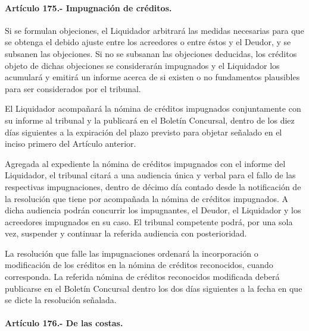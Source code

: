 \documentclass[
]{book}
\begin{document}
\hypertarget{artuxedculo-175.--impugnaciuxf3n-de-cruxe9ditos.}{%
\paragraph*{Artículo 175.- Impugnación de créditos.}\label{artuxedculo-175.--impugnaciuxf3n-de-cruxe9ditos.}}

Si se formulan objeciones, el Liquidador arbitrará las medidas necesarias para que se obtenga el debido ajuste entre los acreedores o entre éstos y el Deudor, y se subsanen las objeciones. Si no se subsanan las objeciones deducidas, los créditos objeto de dichas objeciones se considerarán impugnados y el Liquidador los acumulará y emitirá un informe acerca de si existen o no fundamentos plausibles para ser considerados por el tribunal.

El Liquidador acompañará la nómina de créditos impugnados conjuntamente con su informe al tribunal y la publicará en el Boletín Concursal, dentro de los diez días siguientes a la expiración del plazo previsto para objetar señalado en el inciso primero del Artículo anterior.

Agregada al expediente la nómina de créditos impugnados con el informe del Liquidador, el tribunal citará a una audiencia única y verbal para el fallo de las respectivas impugnaciones, dentro de décimo día contado desde la notificación de la resolución que tiene por acompañada la nómina de créditos impugnados. A dicha audiencia podrán concurrir los impugnantes, el Deudor, el Liquidador y los acreedores impugnados en su caso. El tribunal competente podrá, por una sola vez, suspender y continuar la referida audiencia con posterioridad.

La resolución que falle las impugnaciones ordenará la incorporación o modificación de los créditos en la nómina de créditos reconocidos, cuando corresponda. La referida nómina de créditos reconocidos modificada deberá publicarse en el Boletín Concursal dentro los dos días siguientes a la fecha en que se dicte la resolución señalada.

\hypertarget{artuxedculo-176.--de-las-costas.}{%
\paragraph*{Artículo 176.- De las costas.}\label{artuxedculo-176.--de-las-costas.}}
\end{document}
